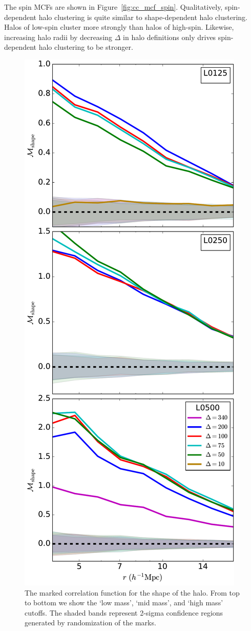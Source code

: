 \documentclass[usenatbib,usegraphicx,letterpaper]{mn2e}
\begin{document}
The spin MCFs are shown in Figure~\ref{fig:cc_mcf_spin}. Qualitatively, spin-dependent halo clustering is 
quite similar to shape-dependent halo clustering. Halos of low-spin cluster more strongly than halos of 
high-spin.  Likewise, increasing halo radii by decreasing $\Delta$ in halo definitions only drives 
spin-dependent halo clustering to be stronger.

\begin{figure}
	\centering
	\includegraphics[width=.4\textwidth]{all_mcf_shape.pdf}
	\caption{
	The marked correlation function for the shape of the halo. From top to bottom we show the `low mass', `mid mass', and `high mass' cutoffs. The shaded bands represent 2-sigma confidence regions generated by randomization of the marks.
}
	\label{fig:cc_mcf_s}
\end{figure}
\end{document}
